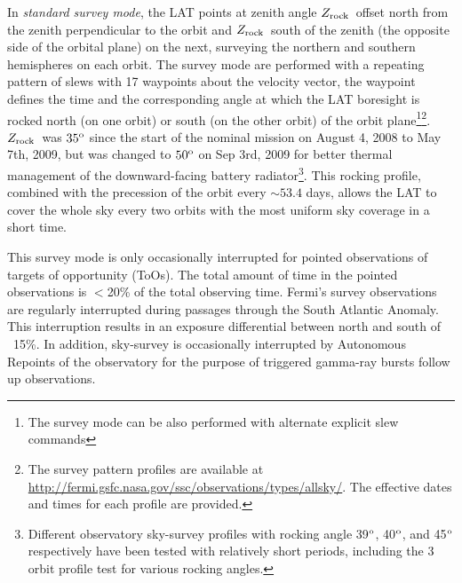 \documentclass[aps,twocolumn,prd,superscriptaddress,showpacs,nofootinbib,fixfloat]{revtex4}
\newcommand{\degree}{^{\rm o}}
\newcommand{\zrock}{$Z_{\rm rock}$}
\begin{document}



In \emph{standard survey mode}, the LAT points at zenith
angle \zrock\ offset north from the zenith perpendicular to
the orbit and \zrock\ south of the zenith (the opposite side
of the orbital plane) on the next, surveying the northern
and southern hemispheres on each orbit. The survey mode are
performed with a repeating pattern of slews with 17
waypoints about the velocity vector, the waypoint defines
the time and the corresponding angle at which the LAT
boresight is rocked north (on one orbit) or south (on the
other orbit) of the orbit plane\footnote{The survey mode can
be also performed with alternate explicit slew
commands}\footnote{The survey pattern profiles are available
at
\url{http://fermi.gsfc.nasa.gov/ssc/observations/types/allsky/}.
The effective dates and times for each profile are provided.
}. \zrock\ was $35\degree$ since the start of the nominal
mission on August 4, 2008 to May 7th, 2009, but was changed
to $50\degree$ on Sep 3rd, 2009 for better thermal
management of the downward-facing battery
radiator\footnote{Different observatory sky-survey profiles
with rocking angle 39$\degree$, 40$\degree$, and 45$\degree$
respectively have been tested with relatively short periods,
including the 3 orbit profile test for various rocking
angles.}. This rocking profile, combined with the precession
of the orbit every $\sim53.4$ days, allows the LAT to cover
the whole sky every two orbits with the most uniform sky
coverage in a short time.

This survey mode is only occasionally interrupted for
pointed observations of targets of opportunity (ToOs). The
total amount of time in the pointed observations is $<$20\%
of the total observing time. Fermi's survey observations are
regularly interrupted during passages through the South
Atlantic Anomaly. This interruption results in an exposure
differential between north and south of ~15\%. In addition,
sky-survey is occasionally interrupted by Autonomous
Repoints of the observatory for the purpose of triggered
gamma-ray bursts follow up observations.  
\end{document}
